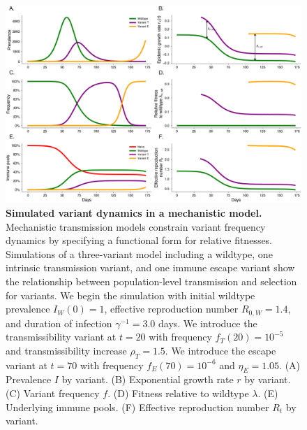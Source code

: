 \documentclass[12pt,oneside,letterpaper]{article}
\newcommand{\wt}{W}
\newcommand{\varEscape}{\eta}
\newcommand{\varTransmission}{\rho}
\begin{document}
\begin{figure}[h]
    \centering
    \includegraphics[width=1.0\linewidth]{./figures/vis_mechanisms.png}
    \caption{
      \textbf{Simulated variant dynamics in a mechanistic model.}
      Mechanistic transmission models constrain variant frequency dynamics by specifying a functional form for relative fitnesses.
      Simulations of a three-variant model including a wildtype, one intrinsic transmission variant, and one immune escape variant show the relationship between population-level transmission and selection for variants.
      We begin the simulation with initial wildtype prevalence $I_\wt(0) = 1$, effective reproduction number $R_{0,\wt} = 1.4$, and duration of infection $\gamma^{-1} = 3.0$ days.
      We introduce the transmissibility variant at $t=20$ with frequency $f_T(20) = 10^{-5}$ and transmissibility increase $\varTransmission_T = 1.5$.
      We introduce the escape variant at $t=70$ with frequency $f_E(70) = 10^{-6}$ and $\varEscape_E = 1.05$.
      (A) Prevalence $I$ by variant.
      (B) Exponential growth rate $r$ by variant.
      (C) Variant frequency $f$.
      (D) Fitness relative to wildtype $\lambda$.
      (E) Underlying immune pools.
      (F) Effective reproduction number $R_t$ by variant.
    }
    \label{fig:vis_mechanisms}
\end{figure}

\end{document}
